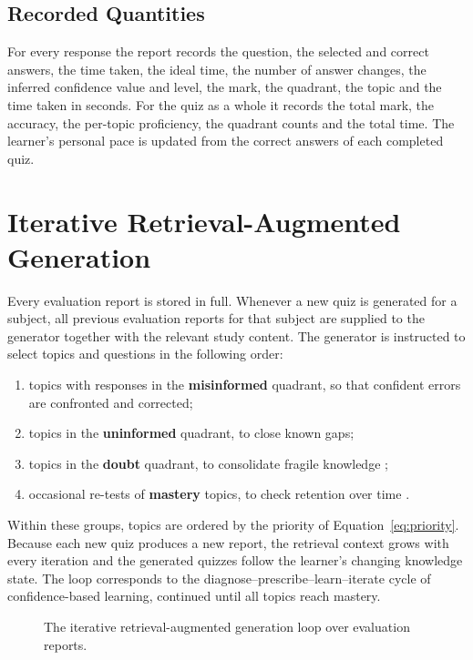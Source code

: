 \documentclass[12pt,a4paper,oneside]{report}
\begin{document}
\subsection{Recorded Quantities}

For every response the report records the question, the selected and
correct answers, the time taken, the ideal time, the number of answer
changes, the inferred confidence value and level, the mark, the quadrant, the topic
and the time taken in seconds. For the quiz as a whole it records the
total mark, the accuracy, the per-topic proficiency, the quadrant counts
and the total time. The learner's personal pace is updated from the
correct answers of each completed quiz.

\section{Iterative Retrieval-Augmented Generation}

Every evaluation report is stored in full. Whenever a new quiz is
generated for a subject, all previous evaluation reports for that subject
are supplied to the generator together with the relevant study content.
The generator is instructed to select topics and questions in the
following order:
\begin{enumerate}
  \item topics with responses in the \textbf{misinformed} quadrant, so that
        confident errors are confronted and corrected;
  \item topics in the \textbf{uninformed} quadrant, to close known gaps;
  \item topics in the \textbf{doubt} quadrant, to consolidate fragile
        knowledge \cite{butler2008};
  \item occasional re-tests of \textbf{mastery} topics, to check retention
        over time \cite{ebbinghaus1885}.
\end{enumerate}
Within these groups, topics are ordered by the priority of
Equation~\eqref{eq:priority}. Because each new quiz produces a new report,
the retrieval context grows with every iteration and the generated quizzes
follow the learner's changing knowledge state. The loop corresponds to the
diagnose--prescribe--learn--iterate cycle of confidence-based learning,
continued until all topics reach mastery.

\begin{figure}[H]
\centering
{}
\caption{The iterative retrieval-augmented generation loop over evaluation reports.}
\label{fig:loop}
\end{figure}
\end{document}
